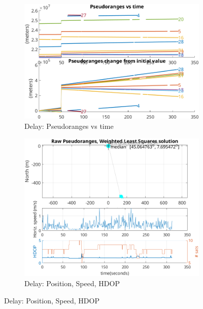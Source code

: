         \begin{figure}[h!]
            \centering
            \begin{subfigure}{0.23\textwidth}
                \includegraphics[width=\textwidth]{images/tests/Monte_Cappuccini/Spoofing/task6_figures/Samsung_A51_Monte_Cappuccini_fig1.png}
                \caption{Delay: Pseudoranges vs time}
            \end{subfigure}
            \hfill
            \begin{subfigure}{0.23\textwidth}
                \includegraphics[width=\textwidth]{images/tests/Monte_Cappuccini/Spoofing/task6_figures/Samsung_A51_Monte_Cappuccini_fig4.png}
                \caption{Delay: Position, Speed, HDOP}
            \end{subfigure}
        \end{figure}

